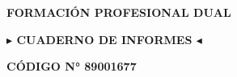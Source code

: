 \documentclass[12pt]{article}
\begin{document}
\begin{center}
\begin{tcolorbox}[colback=white, colframe=black, arc=4mm, boxsep=5mm] %
\centering
    \setlength{\baselineskip}{1.5\baselineskip}
    \textbf{\LARGE{FORMACIÓN PROFESIONAL DUAL}}
\end{tcolorbox}
\end{center}
\vspace*{6cm}
\begin{center}
\textbf{\LARGE{$\blacktriangleright$ CUADERNO DE INFORMES $\blacktriangleleft$}}
\end{center}
\vspace*{5cm}
\textbf{\large{CÓDIGO N° 89001677}}

\newpage

\newpage

\newpage

\newpage


\newpage

\end{document}
